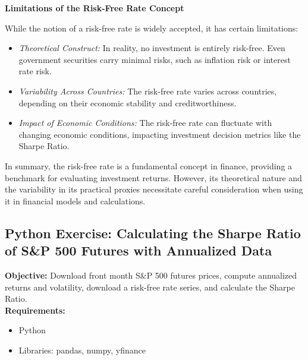 \documentclass{article}
\begin{document}
\textbf{Limitations of the Risk-Free Rate Concept}

While the notion of a risk-free rate is widely accepted, it has certain limitations:

\begin{itemize}
    \item \textit{Theoretical Construct:} In reality, no investment is entirely risk-free. Even government securities carry minimal risks, such as inflation risk or interest rate risk.
    \item \textit{Variability Across Countries:} The risk-free rate varies across countries, depending on their economic stability and creditworthiness.
    \item \textit{Impact of Economic Conditions:} The risk-free rate can fluctuate with changing economic conditions, impacting investment decision metrics like the Sharpe Ratio.
\end{itemize}

In summary, the risk-free rate is a fundamental concept in finance, providing a benchmark for evaluating investment returns. However, its theoretical nature and the variability in its practical proxies necessitate careful consideration when using it in financial models and calculations.

\subsection{Python Exercise: Calculating the Sharpe Ratio of S\&P 500 Futures with Annualized Data}

\textbf{Objective:} Download front month S\&P 500 futures prices, compute annualized returns and volatility, download a risk-free rate series, and calculate the Sharpe Ratio. \\

\textbf{Requirements:}
\begin{itemize}
    \item Python
    \item Libraries: pandas, numpy, yfinance
\end{itemize}
\end{document}
